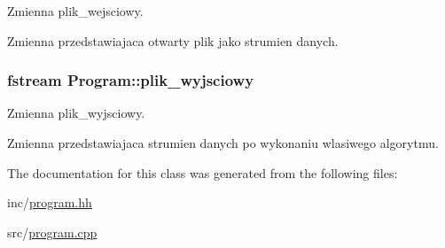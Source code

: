 Zmienna plik\+\_\+wejsciowy. 

Zmienna przedstawiajaca otwarty plik jako strumien danych. \hypertarget{class_program_aaa305591a4333d799c8d353f3072d8e0}{
\subsubsection[{plik\+\_\+wyjsciowy}]{\setlength{\rightskip}{0pt plus 5cm}fstream Program\+::plik\+\_\+wyjsciowy}}\label{class_program_aaa305591a4333d799c8d353f3072d8e0}


Zmienna plik\+\_\+wyjsciowy. 

Zmienna przedstawiajaca strumien danych po wykonaniu wlasiwego algorytmu. 

The documentation for this class was generated from the following files\+:\begin{DoxyCompactItemize}
\item 
inc/\hyperlink{program_8hh}{program.\+hh}\item 
src/\hyperlink{program_8cpp}{program.\+cpp}\end{DoxyCompactItemize}
